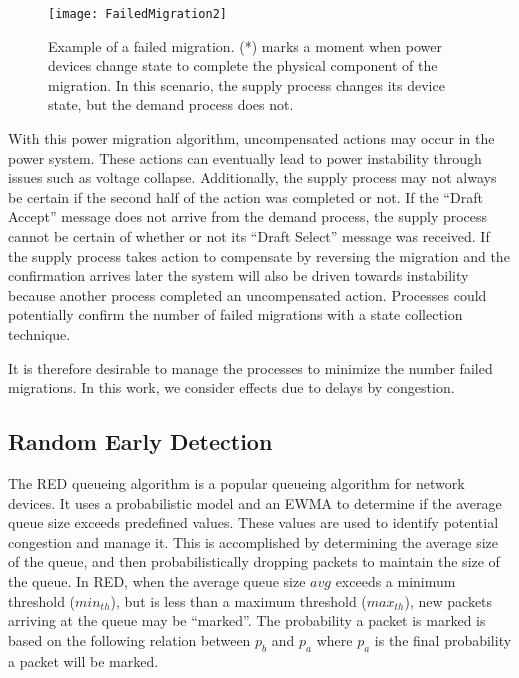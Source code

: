 \begin{figure}
\texttt{[image: FailedMigration2]}
\caption{Example of a failed migration. (*) marks a moment when power devices change state to complete the physical component of the migration. In this scenario, the supply process changes its device state, but the demand process does not.}
\label{fig:failed-migration-2}
\end{figure}

With this power migration algorithm, uncompensated actions may occur in the power system.
These actions can eventually lead to power instability through issues such as voltage collapse.
Additionally, the supply process may not always be certain if the second half of the action was completed or not.
If the ``Draft Accept'' message does not arrive from the demand process, the supply process cannot be certain of whether or not its ``Draft Select'' message was received.
If the supply process takes action to compensate by reversing the migration and the confirmation arrives later the system will also be driven towards instability because another process completed an uncompensated action.
Processes could potentially confirm the number of failed migrations with a state collection technique.

It is therefore desirable to manage the processes to minimize the number failed migrations.
In this work, we consider effects due to delays by congestion.

\subsection{Random Early Detection}
The \ac{RED} queueing algorithm is a popular queueing algorithm for network devices.
It uses a probabilistic model and an \ac{EWMA} to determine if the average queue size exceeds predefined values.
These values are used to identify potential congestion and manage it.
This is accomplished by determining the average size of the queue, and then probabilistically dropping packets to maintain the size of the queue.
In \ac{RED}, when the average queue size $avg$ exceeds a minimum threshold ($min_{th}$), but is less than a maximum threshold ($max_{th}$), new packets arriving at the queue may be ``marked''.
The probability a packet is marked is based on the following relation between $p_{b}$ and $p_{a}$ where $p_{a}$ is the final probability a packet will be marked.

